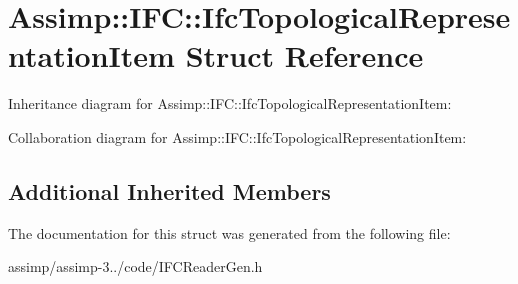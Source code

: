\hypertarget{struct_assimp_1_1_i_f_c_1_1_ifc_topological_representation_item}{\section{Assimp\+:\+:I\+F\+C\+:\+:Ifc\+Topological\+Representation\+Item Struct Reference}
\label{struct_assimp_1_1_i_f_c_1_1_ifc_topological_representation_item}
}


Inheritance diagram for Assimp\+:\+:I\+F\+C\+:\+:Ifc\+Topological\+Representation\+Item\+:


Collaboration diagram for Assimp\+:\+:I\+F\+C\+:\+:Ifc\+Topological\+Representation\+Item\+:
\subsection*{Additional Inherited Members}


The documentation for this struct was generated from the following file\+:\begin{DoxyCompactItemize}
\item 
assimp/assimp-\/3../code/I\+F\+C\+Reader\+Gen.\+h\end{DoxyCompactItemize}
